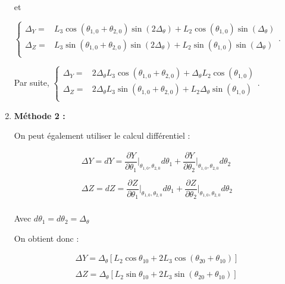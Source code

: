 \documentclass[11pt]{article}
\begin{document}
\begin{UPSTIcorrige}
\begin{enumerate}
et

$
\left\{
\begin{array}{ll}
\Delta_{Y}=&   L_3\cos \left(\theta_{1,0}+ \theta_{2,0}\right) \sin \left(2\Delta_{\theta} \right)
+ L_2 \cos \left(\theta_{1,0}\right) \sin \left(\Delta_{\theta} \right)\\
\Delta_{Z}=& L_3  \sin \left(\theta_{1,0} + \theta_{2,0}\right) \sin\left(2\Delta_{\theta} \right) 
+L_2 \sin \left(\theta_{1,0} \right) \sin\left(\Delta_{\theta} \right)\\
\end{array}.
\right.
$

Par suite, 
$
\left\{
\begin{array}{ll}
\Delta_{Y}=&  2\Delta_{\theta}  L_3\cos \left(\theta_{1,0}+ \theta_{2,0}\right) 
+\Delta_{\theta}  L_2 \cos \left(\theta_{1,0}\right) \\
\Delta_{Z}=& 2\Delta_{\theta} L_3  \sin \left(\theta_{1,0} + \theta_{2,0}\right)  
+L_2 \Delta_{\theta}\sin \left(\theta_{1,0} \right) \\
\end{array}.
\right.
$

\item \textbf{Méthode 2 : }

On peut également utiliser le calcul différentiel : 

\begin{align*}
\Delta Y=d Y=\dfrac{\partial Y}{\partial \theta_1}\vert_{\theta_{1,0},\theta_{2,0}}d\theta_1+\dfrac{\partial Y}{\partial \theta_2}\vert_{\theta_{1,0},\theta_{2,0}}d\theta_2\\
\\
\Delta Z=d Z=\dfrac{\partial Z}{\partial \theta_1}\vert_{\theta_{1,0},\theta_{2,0}}d\theta_1+\dfrac{\partial Z}{\partial \theta_2}\vert_{\theta_{1,0},\theta_{2,0}}d\theta_2\\
\end{align*}

Avec $d\theta_1=d\theta_2=\Delta_{\theta}$

On obtient donc : 

\begin{align*}
\Delta Y=\Delta_{\theta}\left[L_2\cos\theta_{10}+2L_3\cos(\theta_{20}+\theta_{10})\right]\\
\\
\Delta Z=\Delta_{\theta}\left[L_2\sin\theta_{10}+2L_3\sin(\theta_{20}+\theta_{10})\right]
\end{align*}
\end{enumerate}


\end{UPSTIcorrige}
\end{document}

